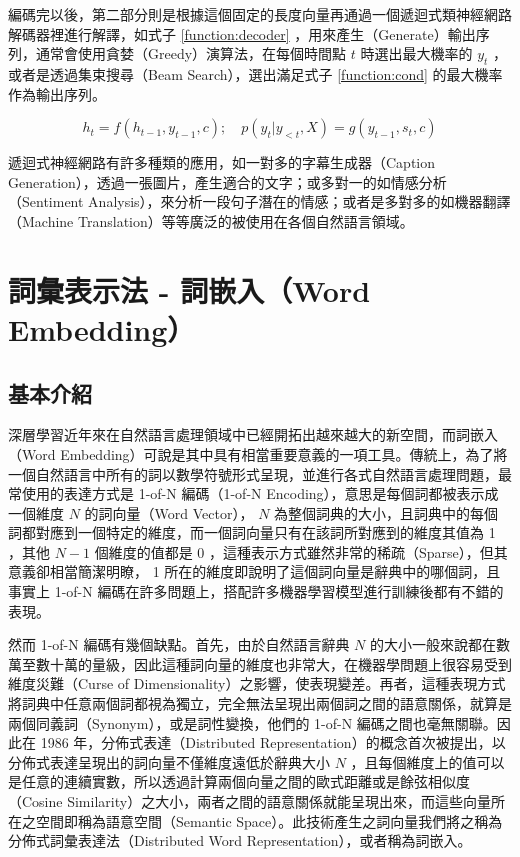 編碼完以後，第二部分則是根據這個固定的長度向量再通過一個遞迴式類神經網路解碼器裡進行解譯，如式子 \ref{function:decoder} ，用來產生（Generate）輸出序列，通常會使用貪婪（Greedy）演算法，在每個時間點 $t$ 時選出最大機率的 $y_t$ ，或者是透過集束搜尋（Beam Search），選出滿足式子 \ref{function:cond} 的最大機率作為輸出序列。

\begin{equation}
    h_t = f(h_{t-1},y_{t-1},c); \quad p(y_t|y_{<t},X) = g(y_{t-1},s_t,c) \label{function:decoder}
\end{equation}

遞迴式神經網路有許多種類的應用，如一對多的字幕生成器（Caption Generation），透過一張圖片，產生適合的文字；或多對一的如情感分析（Sentiment Analysis），來分析一段句子潛在的情感；或者是多對多的如機器翻譯（Machine Translation）等等廣泛的被使用在各個自然語言領域。

\section{詞彙表示法 - 詞嵌入（Word Embedding）}
\subsection{基本介紹}
深層學習近年來在自然語言處理領域中已經開拓出越來越大的新空間，而詞嵌入（Word Embedding）可說是其中具有相當重要意義的一項工具。傳統上，為了將一個自然語言中所有的詞以數學符號形式呈現，並進行各式自然語言處理問題，最常使用的表達方式是 1-of-N 編碼（1-of-N Encoding），意思是每個詞都被表示成一個維度 $N$ 的詞向量（Word Vector）， $N$ 為整個詞典的大小，且詞典中的每個詞都對應到一個特定的維度，而一個詞向量只有在該詞所對應到的維度其值為 1 ，其他 $N-1$ 個維度的值都是 0 ，這種表示方式雖然非常的稀疏（Sparse），但其意義卻相當簡潔明瞭， 1 所在的維度即說明了這個詞向量是辭典中的哪個詞，且事實上 1-of-N 編碼在許多問題上，搭配許多機器學習模型進行訓練後都有不錯的表現。

然而 1-of-N 編碼有幾個缺點。首先，由於自然語言辭典 $N$ 的大小一般來說都在數萬至數十萬的量級，因此這種詞向量的維度也非常大，在機器學問題上很容易受到維度災難（Curse of Dimensionality）之影響，使表現變差。再者，這種表現方式將詞典中任意兩個詞都視為獨立，完全無法呈現出兩個詞之間的語意關係，就算是兩個同義詞（Synonym），或是詞性變換，他們的 1-of-N 編碼之間也毫無關聯。因此在 1986 年，分佈式表達（Distributed Representation）的概念首次被提出，以分佈式表達呈現出的詞向量不僅維度遠低於辭典大小 $N$ ，且每個維度上的值可以是任意的連續實數，所以透過計算兩個向量之間的歐式距離或是餘弦相似度（Cosine Similarity）之大小，兩者之間的語意關係就能呈現出來，而這些向量所在之空間即稱為語意空間（Semantic Space）。此技術產生之詞向量我們將之稱為分佈式詞彙表達法（Distributed Word Representation），或者稱為詞嵌入。

